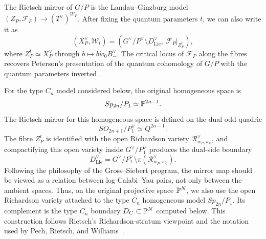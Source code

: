 The Rietsch mirror of \(G/P\) is the Landau--Ginzburg model \((Z_P,\mathcal F_P)\to (T^\vee)^{W_P}\). After fixing the quantum parameters \(t\), we can also write it as
\[
\left(X_P^\vee,\mathcal W_t\right)
=
\left(G^\vee/P^\vee\setminus D_{\mathrm{Lie}}^\vee,\ \mathcal F_P|_{Z_P^t}\right),
\]
where \(Z_P^t\simeq X_P^\vee\) through \(b\mapsto b\dot w_0B_-^\vee\). The critical locus of \(\mathcal F_P\) along the fibres recovers Peterson's presentation of the quantum cohomology of \(G/P\) with the quantum parameters inverted \cite{Peterson,LS}.

For the type \(C_n\) model considered below, the original homogeneous space is
\[
Sp_{2n}/P_1\simeq \mathbb{P}^{2n-1}.
\]
The Rietsch mirror for this homogeneous space is defined on the dual odd quadric
\[
SO_{2n+1}/P_1^\vee\simeq Q^{2n-1}.
\]
The fibre \(Z_P^t\) is identified with the open Richardson variety \(\mathcal R_{w_P,w_0}^\vee\), and compactifying this open variety inside \(G^\vee/P_1^\vee\) produces the dual-side boundary
\[
D_{\mathrm{Lie}}^\vee
=
G^\vee/P_1^\vee\setminus \pi(\mathcal R_{w_P,w_0}^\vee).
\]
Following the philosophy of the Gross--Siebert program, the mirror map should be viewed as a relation between log Calabi--Yau pairs, not only between the ambient spaces. Thus, on the original projective space \(\mathbb{P}^N\), we also use the open Richardson variety attached to the type \(C_n\) homogeneous model \(Sp_{2n}/P_1\). Its complement is the type \(C_n\) boundary \(D_C\subset\mathbb{P}^N\) computed below. This construction follows Rietsch's Richardson-stratum viewpoint and the notation used by Pech, Rietsch, and Williams~\cite{Rietsch,PRW}.
